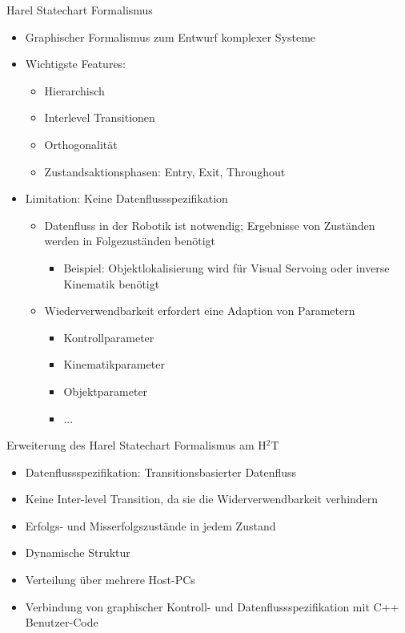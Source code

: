 \documentclass[paper=a4, fontsize=11pt]{scrartcl} %
\numberwithin{equation}{section} %
\numberwithin{figure}{section} %
\numberwithin{table}{section} %
\begin{document}
Harel Statechart Formalismus
\begin{itemize}
\item Graphischer Formalismus zum Entwurf komplexer Systeme
\item Wichtigste Features:
\begin{itemize}
\item Hierarchisch
\item Interlevel Transitionen
\item Orthogonalität
\item Zustandsaktionsphasen: Entry, Exit, Throughout
\end{itemize}
\item Limitation: Keine Datenflussspezifikation
\begin{itemize}
\item Datenfluss in der Robotik ist notwendig; Ergebnisse von Zuständen werden in Folgezuständen benötigt
\begin{itemize}
\item Beispiel: Objektlokalisierung wird für Visual Servoing oder inverse Kinematik benötigt
\end{itemize}
\item Wiederverwendbarkeit erfordert eine Adaption von Parametern
\begin{itemize}
\item Kontrollparameter
\item Kinematikparameter
\item Objektparameter
\item ...
\end{itemize}
\end{itemize}
\end{itemize}

Erweiterung des Harel Statechart Formalismus am H${^2}$T
\begin{itemize}
\item Datenflussspezifikation: Transitionsbasierter Datenfluss
\item Keine Inter-level Transition, da sie die Widerverwendbarkeit verhindern
\item Erfolgs- und Misserfolgszustände in jedem Zustand
\item Dynamische Struktur
\item Verteilung über mehrere Host-PCs
\item Verbindung von graphischer Kontroll- und Datenflussspezifikation mit C++ Benutzer-Code
\end{itemize}
\end{document}
